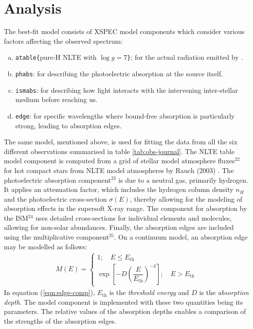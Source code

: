 \section{Analysis} \label{sec:analysis}
	The best-fit model consists of XSPEC model components which consider various factors affecting the observed spectrum:
    \begin{enumerate}[a)]
   		\item \texttt{atable\{}pure-H NLTE with $\log{g}=7$\texttt{\}}: for the actual radiation emitted by \source.
   		\item \texttt{phabs}: for describing the photoelectric absorption at the source itself.
   		\item \texttt{ismabs}: for describing how light interacts with the intervening inter-stellar medium before reaching us.
   		\item \texttt{edge}: for specific wavelengths where bound-free absorption is particularly strong, leading to absorption edges.
   	\end{enumerate}
   	
   	The same model, mentioned above, is used for fitting the data from all the six different observations summarised in table \ref{tab:obs-journal}. The NLTE table model component is computed from a grid of stellar model atmosphere fluxes$^{22}$ for hot compact stars from NLTE model atmospheres by Rauch (2003) \cite{rauch2003grid}. The photoelectric absorption component$^{23}$ is due to a neutral gas, primarily hydrogen. It applies an attenuation factor, which includes the hydrogen column density $n_H$ and the photoelectric cross-section $\sigma(E)$, thereby allowing for the modeling of absorption effects in the supersoft X-ray range. The component for absorption by the ISM$^{24}$ uses detailed cross-sections for individual elements and molecules, allowing for non-solar abundances. Finally, the absorption edges are included using the multiplicative component$^{25}$. On a continuum model, an absorption edge may be modelled as follows:
    \begin{align}
    	M(E)=\begin{cases}
    		{1;\quad E\leqslant E_\text{th}} \\
    		{\exp{\left[ -D\left(\dfrac{E}{E_\text{th}}\right)^{-3} \right]};\quad E> E_\text{th}}
    	\end{cases} \label{eqn:edge-comp}
    \end{align}
    In equation (\ref{eqn:edge-comp}), $E_\text{th}$ is the \textit{threshold energy} and $D$ is the \textit{absorption depth}. The model component is implemented with these two quantities being its parameters. The relative values of the absorption depths enables a comparison of the strengths of the absorption edges.
    
